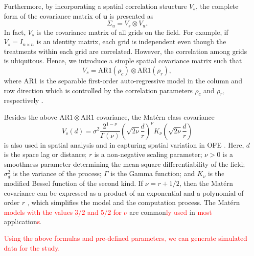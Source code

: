 \documentclass[a4paper]{article} 	%
\newcommand{\Matern}{Mat\'ern }
\newcommand{\AR}{\mathrm{AR1}}
\newcommand{\revision}[1]{\textcolor{red}{#1}}
\begin{document}
Furthermore, by incorporating a spatial correlation structure $V_s$, the complete form of the covariance matrix of $\bm{u}$ is presented as 
\begin{equation}\label{eq:varu}
	\Sigma_u = V_s \otimes V_u. 
\end{equation}
In fact, $V_s$ is the covariance matrix of all grids on the field. For example, if $V_s=I_{n\times n}$ is an identity matrix, each grid is independent even though the treatments within each grid are correlated. However, the correlation among grids is ubiquitous. Hence, we introduce a simple spatial covariance matrix such that 
\begin{equation}\label{eq:ar1cov}
	V_s = \AR(\rho_c)\otimes \AR(\rho_r),
\end{equation}
where AR1 is the separable first-order auto-regressive model in the column and row direction which is controlled by the correlation parameters $\rho_c$ and $\rho_r$, respectively \parencite{Butler2017ASRemlR}. 

Besides the above $\AR\otimes\AR$ covariance, the \Matern class covariance  
\begin{equation}\label{eq:matcov}
V_s(d) = \sigma^2 \frac{2^{1-\nu}}{\Gamma(\nu)} \left( \sqrt{2\nu} \frac{d}{r}\right)^\nu K_\nu\left( \sqrt{2\nu} \frac{d}{r}\right)
\end{equation}
is also used in spatial analysis \parencite{Cressie1999Classes} and in capturing spatial variation in OFE \parencite{Selle2019Flexible}. Here, $d$ is the space lag or distance; $r$ is a non-negative scaling parameter; $\nu> 0$ is a smoothness parameter determining the mean-square differentiability of the field; $\sigma_d^2$ is the variance of the process; $\Gamma$ is the Gamma function; and $K_\nu$ is the modified Bessel function of the second kind. If $\nu = r + 1/2$, then the \Matern covariance can be expressed as a product of an exponential and a polynomial of order $r$ \parencite{Pandit2019Comparative, Abramowitz1974Handbook}, which simplifies the model and the computation process. The \Matern \revision{models} \revision{with the values $3/2$ and $5/2$ for $\nu$} are common\revision{ly used} in \revision{most} application\revision{s}. 


\revision{Using the above formulas and pre-defined parameters, we can generate simulated data for the study.}


\end{document}
